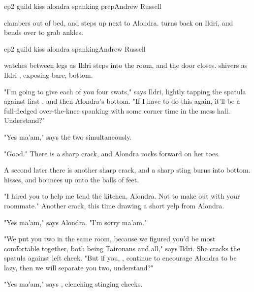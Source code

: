 \documentclass{book}
\begin{document}
\begin{childnode}{ep2 guild kiss alondra spanking prep}{Andrew Russell}

    \name{} clambers out of bed, and steps up next to Alondra. \HeShe{} turns \hisher{} back on Ildri, and bends over to grab \hisher{} ankles.


\end{childnode}


\begin{childnode}{ep2 guild kiss alondra spanking}{Andrew Russell}

    \name{} watches between \hisher{} legs as Ildri steps into the room, and the door closes. \HeShe{} shivers as Ildri , exposing \hisher{} bare, \bumadj{} bottom.

    "I'm going to give each of you four swats," says Ildri, lightly tapping the spatula against first \names{}, and then Alondra's bottom. "If I have to do this again, it'll be a full-fledged over-the-knee spanking with some corner time in the mess hall. 
    Understand?"

    "Yes ma'am," says the two simultaneously.

    "Good." There is a sharp crack, and Alondra rocks forward on her toes.

    A second later there is another sharp crack, and a sharp sting burns into \names{} bottom. \HeShe{} hisses, and bounces up onto the balls of \hisher{} feet.

    "I hired you to help me tend the kitchen, Alondra. Not to make out with your roommate." Another crack, this time drawing a short yelp from Alondra.

    "Yes ma'am," says Alondra. "I'm sorry ma'am."

    "We put you two in the same room, because we figured you'd be most comfortable together, both being Taironans and all," says Ildri. She cracks the spatula against \names{} left cheek. "But if you, \name{}, continue to encourage Alondra to be lazy, then we will 
    separate you two, understand?"
    
    "Yes ma'am," says \name{}, clenching \hisher{} stinging cheeks.


\end{childnode}
\end{document}
